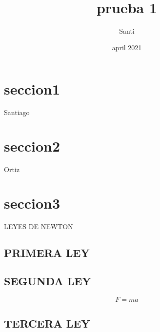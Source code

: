 \documentclass{article}
\title{prueba 1}
\author{Santi}
\date{april 2021}
\begin{document}
	
	\maketitle
	
	\section{seccion1}
	Santiago
	\section{seccion2}
	Ortiz
	\section{seccion3}
	LEYES DE NEWTON
	\subsection{PRIMERA LEY}
	\subsection{SEGUNDA LEY}
	\begin{equation}
		F=ma
	\end{equation}
	\subsection{TERCERA LEY}
	
\end{document}
